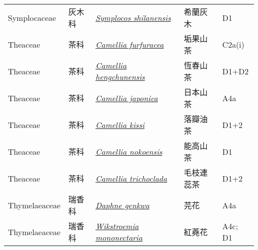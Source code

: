 {\begin{longtable}{L{2.5cm}L{2cm}L{5cm}L{2.5cm}L{3cm}}
    Symplocaceae & 灰木科 & \href{http://www.theplantlist.org/tpl1.1/search?q=Symplocos+shilanensis}{\textit{Symplocos shilanensis} } & 希蘭灰木 & D1    \\
    Theaceae & 茶科 & \href{http://www.theplantlist.org/tpl1.1/search?q=Camellia+furfuracea}{\textit{Camellia furfuracea} } & 垢果山茶 & C2a(i)    \\
    Theaceae & 茶科 & \href{http://www.theplantlist.org/tpl1.1/search?q=Camellia+hengchunensis}{\textit{Camellia hengchunensis} } & 恆春山茶 & D1+D2    \\
    Theaceae & 茶科 & \href{http://www.theplantlist.org/tpl1.1/search?q=Camellia+japonica}{\textit{Camellia japonica} } & 日本山茶 & A4a    \\
    Theaceae & 茶科 & \href{http://www.theplantlist.org/tpl1.1/search?q=Camellia+kissi}{\textit{Camellia kissi} } & 落瓣油茶 & D1+2    \\
    Theaceae & 茶科 & \href{http://www.theplantlist.org/tpl1.1/search?q=Camellia+nokoensis}{\textit{Camellia nokoensis} } & 能高山茶 & D1    \\
    Theaceae & 茶科 & \href{http://www.theplantlist.org/tpl1.1/search?q=Camellia+trichoclada}{\textit{Camellia trichoclada} } & 毛枝連蕊茶 & D1+2    \\
    Thymelaeaceae & 瑞香科 & \href{http://www.theplantlist.org/tpl1.1/search?q=Daphne+genkwa}{\textit{Daphne genkwa} } & 芫花 & A4a    \\
    Thymelaeaceae & 瑞香科 & \href{http://www.theplantlist.org/tpl1.1/search?q=Wikstroemia+mononectaria}{\textit{Wikstroemia mononectaria} } & 紅蕘花 & A4c; D1    \\

\end{longtable}}
